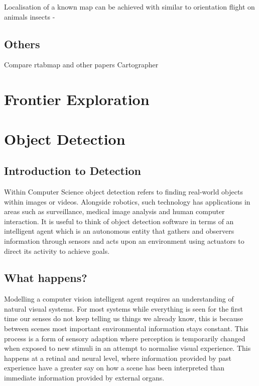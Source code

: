 \documentclass{mproj}
\begin{document}
Localisation of a known map can be achieved with similar to orientation flight on animals insects -

\subsection{Others}

Compare rtabmap and other papers Cartographer

\section{Frontier Exploration}






\section{Object Detection}

\subsection{Introduction to Detection}

Within Computer Science object detection refers to finding real-world objects within images or videos. Alongside robotics, such technology has applications in areas such as surveillance, medical image analysis and human computer interaction. It is useful to think of object detection software in terms of an intelligent agent which is an autonomous entity that gathers and observers information through sensors and acts upon an environment using actuators to direct its activity to achieve goals.\cite{Norvig2003}

\subsection{What happens?}
Modelling a computer vision intelligent agent requires an understanding of natural visual systems. For most systems while everything is seen for the first time our senses do not keep telling us things we already know, this is because between scenes most important environmental information stays constant. This process is a form of sensory adaption where perception is temporarily changed when exposed to new stimuli in an attempt to normalise visual experience.\cite{Webster2015} This happens at a retinal and neural level, where information provided by past experience have a greater say on how a scene has been interpreted than immediate information provided by external organs.
\end{document}

